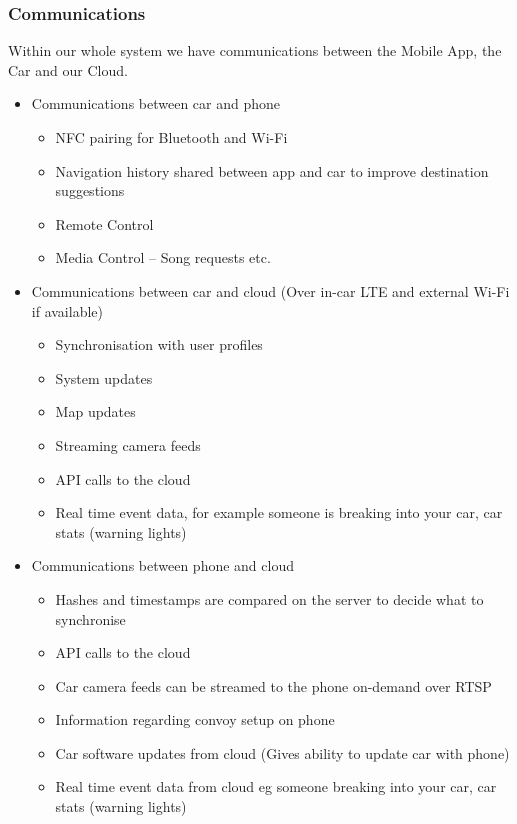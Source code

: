 \documentclass{article}
\begin{document}
\subsubsection{Communications}
Within our whole system we have communications between the Mobile App, the Car and our Cloud. 
  \begin{itemize}
      \item Communications between car and phone
      \begin{itemize}     
        	\item NFC pairing for Bluetooth and Wi-Fi
            \item Navigation history shared between app and car to improve destination suggestions
            \item Remote Control
            \item Media Control -- Song requests etc.
	  \end{itemize}
	  \item Communications between car and cloud (Over in-car LTE and external Wi-Fi if available)     	
        \begin{itemize}
          \item Synchronisation with user profiles
          \item System updates
          \item Map updates
          \item Streaming camera feeds
          \item API calls to the cloud
          \item Real time event data, for example someone is breaking into your car, car stats (warning lights)
        \end{itemize}
      \item Communications between phone and cloud      
        \begin{itemize}
        	\item Hashes and timestamps are compared on the server to decide what to synchronise
            \item API calls to the cloud
            \item Car camera feeds can be streamed to the phone on-demand over RTSP
            \item Information regarding convoy setup on phone
            \item Car software updates from cloud (Gives ability to update car with phone)
            \item Real time event data from cloud eg someone breaking into your car, car stats (warning lights)

\end{itemize}
\end{itemize}
\end{document}
